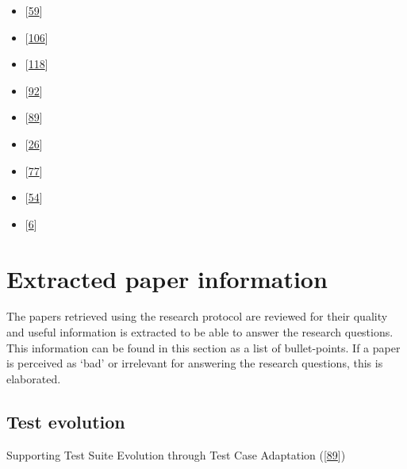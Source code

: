 \documentclass[]{book}
\providecommand{\tightlist}{%
  \setlength{\itemsep}{0pt}\setlength{\parskip}{0pt}}
\begin{document}
\begin{itemize}
  \begin{itemize}
  \tightlist
  \item
    {[}\protect\hyperlink{ref-hemmati2018}{59}{]}
  \item
    {[}\protect\hyperlink{ref-shamshiri2018automatically}{106}{]}
  \item
    {[}\protect\hyperlink{ref-vernotte2015}{118}{]}
  \item
    {[}\protect\hyperlink{ref-noor2015test}{92}{]}
  \item
    {[}\protect\hyperlink{ref-supportingtestsuite}{89}{]}
  \item
    {[}\protect\hyperlink{ref-bowring2014obsidian}{26}{]}
  \item
    {[}\protect\hyperlink{ref-leung2015testing}{77}{]}
  \item
    {[}\protect\hyperlink{ref-greiler2013}{54}{]}
  \item
    {[}\protect\hyperlink{ref-atifi2017}{6}{]}
  \end{itemize}
\end{itemize}

\section{Extracted paper information}\label{extracted-paper-information}

The papers retrieved using the research protocol are reviewed for their
quality and useful information is extracted to be able to answer the
research questions. This information can be found in this section as a
list of bullet-points. If a paper is perceived as `bad' or irrelevant
for answering the research questions, this is elaborated.

\subsection{Test evolution}\label{test-evolution}

Supporting Test Suite Evolution through Test Case Adaptation
({[}\protect\hyperlink{ref-supportingtestsuite}{89}{]})
\end{document}
